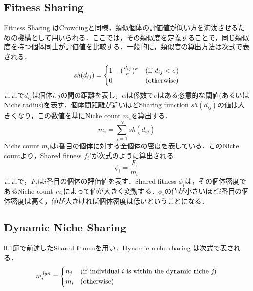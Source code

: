 \documentclass[a4j,11pt]{jarticle}
\begin{document}
\subsection{Fitness Sharing}
\label{ss:fs}
Fitness Sharing \cite{FS} はCrowdingと同様，類似個体の評価値が低い方を淘汰させるための機構として用いられる．ここでは，その類似度を定義することで，同じ類似度を持つ個体同士が評価値を比較する．一般的に，類似度の算出方法は次式で表される．
\begin{equation}
\label{eq:sfunc}
sh(d_{ij})= \begin{cases}
1-(\frac{d_{ij}}{\sigma})^\alpha & ({\rm if} \ d_{ij} < \sigma)\\
0 & ({\rm otherwise})
\end{cases}
\end{equation}
ここで$d_{ij}$は個体$i,j$の間の距離を表し，$\alpha$は係数で$\sigma$はある恣意的な閾値(あるいはNiche radius)を表す．個体間距離が近いほどSharing function $sh(d_{ij})$の値は大きくなり，この数値を基にNiche count $m_i$を算出する．
\begin{equation}
\label{eq:nc}
m_i=\sum_{j=1}^N sh(d_{ij})
\end{equation}
Niche count $m_i$は$i$番目の個体に対する全個体の密度を表している．このNiche countより，Shared fitness $f_i'$が次式のように算出される．
\begin{equation}
\label{eq:sfit}
\phi_i=\frac{F_i}{m_i}
\end{equation}
ここで，$F_i$は$i$番目の個体の評価値を表す．Shared fitness $\phi_i$は，その個体密度であるNiche count $m_i$によって値が大きく変動する．$\phi_i$の値が小さいほど$i$番目の個体密度は高く，値が大きければ個体密度は低いということになる．

\subsection{Dynamic Niche Sharing}
\label{ss:dns}
\ref{ss:fs}節で前述したShared fitnessを用い，Dynamic niche sharing \cite{DNS} は次式で表される．
\begin{equation}
\label{eq:dns}
m_i^{dyn}=\begin{cases}
n_j & ({\rm if \ individual}\ i {\rm \ is \ within \ the \ dynamic \ niche }\ j) \\
m_i & ({\rm otherwise})
\end{cases}
\end{equation}

\end{document}
